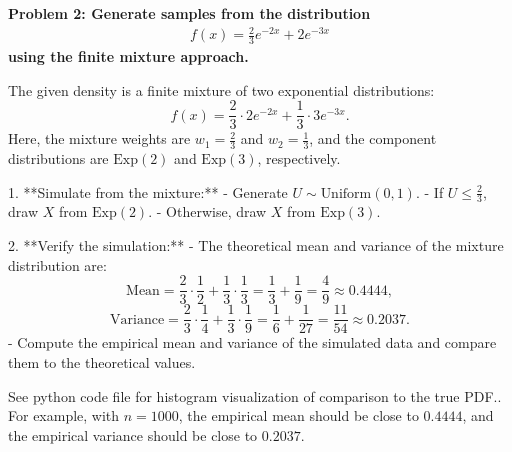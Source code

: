 \documentclass[12pt]{article}
\begin{document}
\begin{homeworkProblem}
\textbf{Problem 2: Generate samples from the distribution
\begin{gather}
    f(x) = \frac{2}{3}e^{-2x} + 2e^{-3x}
\end{gather}
using the finite mixture approach.}

\begin{solution}
The given density is a finite mixture of two exponential distributions:
\[
f(x) = \frac{2}{3} \cdot 2e^{-2x} + \frac{1}{3} \cdot 3e^{-3x}.
\]
Here, the mixture weights are \( w_1 = \frac{2}{3} \) and \( w_2 = \frac{1}{3} \), and the component distributions are \( \text{Exp}(2) \) and \( \text{Exp}(3) \), respectively.

1. **Simulate from the mixture:**
   - Generate \( U \sim \text{Uniform}(0,1) \).
   - If \( U \leq \frac{2}{3} \), draw \( X \) from \( \text{Exp}(2) \).
   - Otherwise, draw \( X \) from \( \text{Exp}(3) \).

2. **Verify the simulation:**
   - The theoretical mean and variance of the mixture distribution are:
     \[
     \text{Mean} = \frac{2}{3} \cdot \frac{1}{2} + \frac{1}{3} \cdot \frac{1}{3} = \frac{1}{3} + \frac{1}{9} = \frac{4}{9} \approx 0.4444,
     \]
     \[
     \text{Variance} = \frac{2}{3} \cdot \frac{1}{4} + \frac{1}{3} \cdot \frac{1}{9} = \frac{1}{6} + \frac{1}{27} = \frac{11}{54} \approx 0.2037.
     \]
   - Compute the empirical mean and variance of the simulated data and compare them to the theoretical values.

   See python code file for histogram visualization of comparison to the true PDF.. For example, with \( n = 1000 \), the empirical mean should be close to \( 0.4444 \), and the empirical variance should be close to \( 0.2037 \).
\end{solution}
\end{homeworkProblem}

\pagebreak
\end{document}
